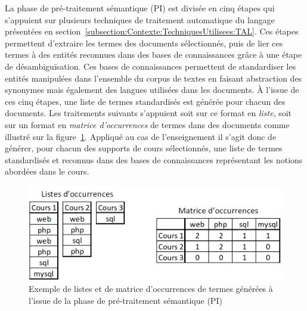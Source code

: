 La phase de pré-traitement sémantique (PI) est divisée en cinq étapes qui s'appuient sur plusieurs techniques de traitement automatique du langage présentées en section~\ref{subsection:Contexte:TechniquesUtilisees:TAL}.
Ces étapes permettent d'extraire les termes des documents sélectionnés, puis de lier ces termes à des entités reconnues dans des bases de connaissances grâce à une étape de désambiguïsation.
Ces bases de connaissances permettent de standardiser les entités manipulées dans l'ensemble du corpus de textes en faisant abstraction des synonymes mais également des langues utilisées dans les documents.
À l'issue de ces cinq étapes, une liste de termes standardisés est générée pour chacun des documents.
Les traitements suivants s'appuient soit sur ce format en \textit{liste}, soit sur un format en \textit{matrice d'occurrences} de termes dans des documents comme illustré sur la figure~\ref{figure:3-MethodeGenerale-PI-outputs}.
Appliqué au cas de l'enseignement il s'agit donc de générer, pour chacun des supports de cours sélectionnés, une liste de termes standardisés et reconnus dans des bases de connaissances représentant les notions abordées dans le cours.


\begin{figure}[ht]
\centering
\centerline{  %
\includegraphics[scale=0.85]{3-Methode-CREA/images/0-fonctionnement-general/listes-et-matrice.png}
}
\caption{Exemple de listes et de matrice d'occurrences de termes générées à l'issue de la phase de pré-traitement sémantique (PI)}
\label{figure:3-MethodeGenerale-PI-outputs}
\end{figure}

\bigskip

